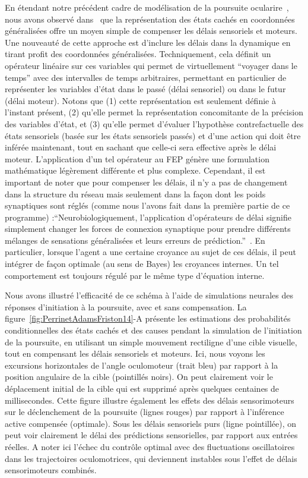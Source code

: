 En étendant notre précédent cadre de modélisation de la poursuite ocularire~\citep{Adams12},
nous avons observé dans~\citep{PerrinetAdamsFriston14}
que la représentation des états cachés en coordonnées généralisées offre
un moyen simple de compenser les délais sensoriels et moteurs. Une nouveauté de cette
approche est d'inclure les délais dans la dynamique en tirant profit
des coordonnées généralisées. Techniquement, cela définit un opérateur
linéaire sur ces variables qui permet de virtuellement ``voyager dans le temps''
 avec des intervalles
de temps arbitraires, permettant en particulier de représenter les
variables d'état dans le passé (délai sensoriel) ou dans le futur
(délai moteur). Notons que (1) cette représentation est seulement définie à
l'instant présent, (2) qu'elle permet la représentation concomitante de
la précision des variables d'état, et (3) qu'elle permet d'évaluer
l'hypothèse contrefactuelle des états sensoriels (basée sur les états
sensoriels passés) et d'une action qui doit être inférée maintenant,
tout en sachant que celle-ci sera effective après le délai moteur.
L'application d'un tel opérateur au FEP génère une formulation
mathématique légèrement différente et plus complexe. Cependant, il est
important de noter que pour compenser les délais, il n'y a pas de
changement dans la structure du réseau mais seulement dans la façon dont
les poids synaptiques sont réglés (comme nous l'avons fait dans la
première partie de ce programme) :``Neurobiologiquement, l'application
d'opérateurs de délai signifie simplement changer les forces de
connexion synaptique pour prendre différents mélanges de sensations
généralisées et leurs erreurs de prédiction.''~\citep[section 3.1, ma traduction]{PerrinetAdamsFriston14}. En particulier, lorsque l'agent a une
certaine croyance au sujet de ces délais, il peut intégrer de façon
optimale (au sens de Bayes) les croyances internes. Un tel comportement est
toujours régulé par le même type d'équation interne.

Nous avons illustré l'efficacité de ce schéma à l'aide de simulations
neurales des réponses d'initiation à la poursuite, avec et sans
compensation. La figure~\ref{fig:PerrinetAdamsFriston14}-A présente les estimations des probabilités conditionnelles
des états cachés et des causes pendant la simulation de l'initiation de
la poursuite, en utilisant un simple mouvement rectiligne d'une cible visuelle, tout
en compensant les délais sensoriels et moteurs. Ici, nous voyons les
excursions horizontales de l'angle oculomoteur (trait bleu) par rapport à la
position angulaire de la cible (pointillés noirs). %
On peut clairement voir
le déplacement initial de la cible qui est supprimé après
quelques centaines de millisecondes. Cette figure illustre également les
effets des délais sensorimoteurs sur le déclenchement de la poursuite
(lignes rouges) par rapport à l'inférence active compensée (optimale).
Sous les délais sensoriels purs (ligne pointillée), on peut voir
clairement le délai des prédictions sensorielles, par rapport aux
entrées réelles. A noter ici l'échec du contrôle optimal avec des
fluctuations oscillatoires dans les trajectoires oculomotrices, qui
deviennent instables sous l'effet de délais sensorimoteurs combinés.

